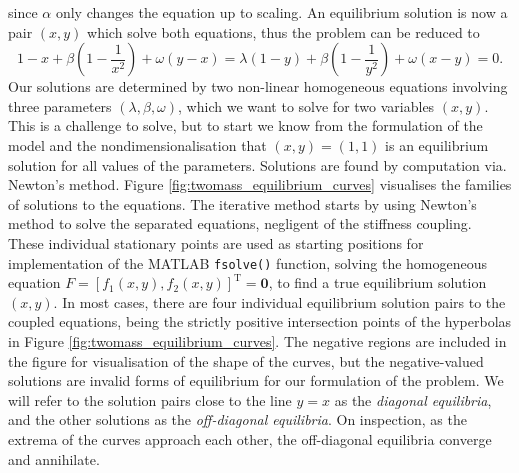 since \(\alpha\) only changes the equation up to scaling. 
An equilibrium solution is now a pair \((x,y)\) which solve both equations,
thus the problem can be reduced to
\begin{equation}
    1-x + \beta\left(1 - \frac{1}{x^2}\right) + \omega(y-x) = \lambda(1-y) + \beta\left(1 - \frac{1}{y^2}\right) + \omega(x-y) = 0.
    \label{eqn:twomass_noalpha_equilibrium_solutions}
\end{equation}
Our solutions are determined by two non-linear homogeneous equations involving three parameters \((\lambda, \beta, \omega)\), which we want to solve for two variables \((x,y)\).
This is a challenge to solve, but to start we know from the formulation of the model and the nondimensionalisation that \((x,y) = (1,1)\) is an equilibrium solution for all values of the parameters.
Solutions are found by computation via. Newton's method.
Figure \ref{fig:twomass_equilibrium_curves} visualises the families of solutions to the equations.
The iterative method starts by using Newton's method to solve the separated equations, negligent of the stiffness coupling.
These individual stationary points are used as starting positions for implementation of the MATLAB \texttt{fsolve()} function,
solving the homogeneous equation \(F = [f_1(x,y), f_2(x,y)]^\mathrm{T} = \mathbf{0}\),
to find a true equilibrium solution \((x,y)\).
In most cases, there are four individual equilibrium solution pairs to the coupled equations,
being the strictly positive intersection points of the hyperbolas in Figure \ref{fig:twomass_equilibrium_curves}.
The negative regions are included in the figure for visualisation of the shape of the curves,
but the negative-valued solutions are invalid forms of equilibrium for our formulation of the problem.
We will refer to the solution pairs close to the line $y=x$ as the \textit{diagonal equilibria},
and the other solutions as the \textit{off-diagonal equilibria}.
On inspection, as the extrema of the curves approach each other,
the off-diagonal equilibria converge and annihilate. %

